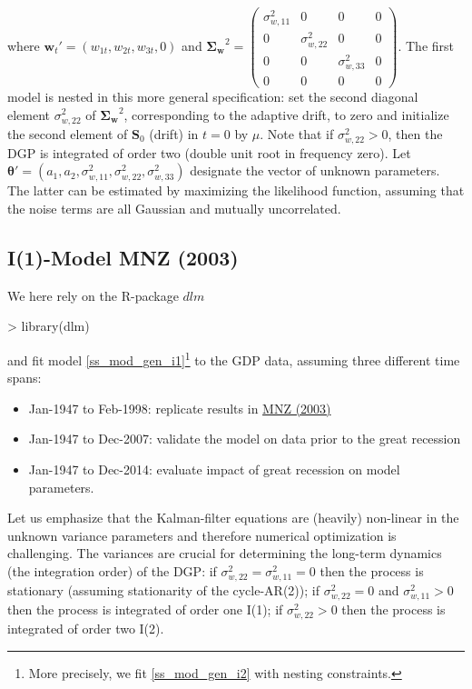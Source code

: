 \documentclass[a4paper]{book}
\begin{document}
where $\mathbf{w}_t'=(w_{1t},w_{2t},w_{3t},0)$ and $\boldsymbol{\Sigma_w}^2=\left(\begin{array}{cccc}\sigma_{w,11}^2&0&0&0\\0&\sigma_{w,22}^2&0&0\\0&0&\sigma_{w,33}^2&0\\0&0&0&0\end{array}\right)$. The first model is nested in this more general specification: set the second diagonal element $\sigma_{w,22}^2$ of $\boldsymbol{\Sigma_w}^2$,  corresponding to the adaptive drift, to zero and initialize the second element of $\mathbf{S}_0$ (drift) in $t=0$ by $\mu$. Note that if $\sigma_{w,22}^2>0$, then the DGP is integrated of order two (double unit root in frequency zero). Let  $\boldsymbol{\theta}'=(a_1,a_2,\sigma_{w,11}^2,\sigma_{w,22}^2,\sigma_{w,33}^2)$ designate the vector of unknown parameters. The latter can be estimated by maximizing the likelihood function, assuming that the noise terms are all Gaussian and mutually uncorrelated. 





\subsection{I(1)-Model MNZ (2003)}\label{mnz_m-gr}

We here rely on the R-package $dlm$
\begin{Schunk}
\begin{Sinput}
> library(dlm)
\end{Sinput}
\end{Schunk}
and fit model \ref{ss_mod_gen_i1}\footnote{More precisely, we fit \ref{ss_mod_gen_i2} with nesting constraints.} to the GDP data, assuming three different time spans: 
\begin{itemize}
\item Jan-1947 to Feb-1998: replicate results in \href{https://www.dropbox.com/s/1qn5h7s02c86j8i/mnz03.pdf?dl=0}{MNZ (2003)}
\item Jan-1947 to Dec-2007: validate the model on data prior to the great recession
\item Jan-1947 to Dec-2014: evaluate impact of great recession on model parameters. 
\end{itemize}
Let us emphasize that the Kalman-filter equations are (heavily) non-linear in the unknown variance parameters and therefore numerical optimization is challenging. The variances are crucial for determining the long-term dynamics (the integration order) of the DGP: if $\sigma_{w,22}^2=\sigma_{w,11}^2=0$ then the process is stationary (assuming stationarity of the cycle-AR(2)); if $\sigma_{w,22}^2=0$ and $\sigma_{w,11}^2>0$ then the process is integrated of order one I(1); if $\sigma_{w,22}^2>0$ then the process is integrated of order two I(2). 
\end{document}
